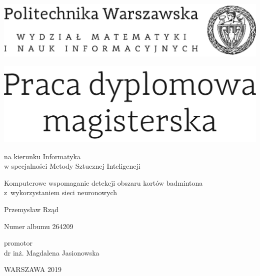 \documentclass[12pt,twoside,a4paper]{article}
\newcommand{\discipline}{Informatyka}
\newcommand{\spec}{Metody Sztucznej Inteligencji} %
\renewcommand{\title}{Komputerowe wspomaganie detekcji obszaru kortów badmintona \mbox{z wykorzystaniem} sieci neuronowych}
\renewcommand{\author}{Przemysław Rząd}
\newcommand{\album}{264209}
\newcommand{\supervisor}{dr inż. Magdalena Jasionowska}
\renewcommand{\year}{2019}
\begin{document}
\pagestyle{empty}

\begin{center}
\includegraphics[scale=1.]{img/politechnika} 
\vspace{70pt}


\includegraphics[scale=1.]{img/praca_mgr} %

{ \arial na kierunku \discipline
\\ w specjalności \spec %

\vspace{40pt}
{\arial \large \title}

\vspace{50pt}

{\arial \huge \author}

\vspace{5pt}

Numer albumu \album

\vspace{40pt}

promotor \\
{\arial \supervisor}

\vspace{15pt}
 

 \vfill
WARSZAWA \year \\
}
\end{center}
\end{document}
